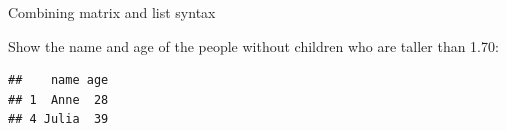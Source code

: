 \documentclass[ignorenonframetext,]{beamer}
\newenvironment{Shaded}{\begin{snugshade}}{\end{snugshade}}
\newcommand{\FloatTok}[1]{\textcolor[rgb]{0.00,0.00,0.81}{#1}}
\newcommand{\KeywordTok}[1]{\textcolor[rgb]{0.13,0.29,0.53}{\textbf{#1}}}
\newcommand{\NormalTok}[1]{#1}
\newcommand{\OperatorTok}[1]{\textcolor[rgb]{0.81,0.36,0.00}{\textbf{#1}}}
\newcommand{\OtherTok}[1]{\textcolor[rgb]{0.56,0.35,0.01}{#1}}
\newcommand{\StringTok}[1]{\textcolor[rgb]{0.31,0.60,0.02}{#1}}
\begin{document}
\begin{frame}[fragile]{Combining matrix and list syntax}
\protect\hypertarget{combining-matrix-and-list-syntax-1}{}

Show the name and age of the people without children who are taller than
1.70:

\begin{Shaded}
\end{Shaded}

\begin{verbatim}
##    name age
## 1  Anne  28
## 4 Julia  39
\end{verbatim}

\end{frame}
\end{document}
